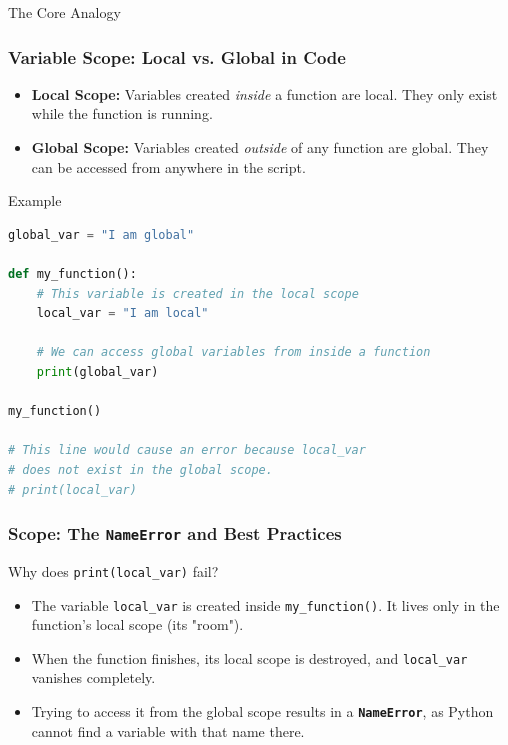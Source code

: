 \documentclass{beamer}
\begin{document}
\begin{frame}[fragile]
\begin{block}{The Core Analogy}
\begin{frame}[fragile]
    \frametitle{Variable Scope: Local vs. Global in Code}
    \begin{itemize}
    \item \textbf{Local Scope:} Variables created \textit{inside} a function are local. They only exist while the function is running.
    \item \textbf{Global Scope:} Variables created \textit{outside} of any function are global. They can be accessed from anywhere in the script.
    \end{itemize}
    
    \begin{block}{Example}
    \begin{lstlisting}[language=Python]
global_var = "I am global"

def my_function():
    # This variable is created in the local scope
    local_var = "I am local" 
    
    # We can access global variables from inside a function
    print(global_var)

my_function()

# This line would cause an error because local_var
# does not exist in the global scope.
# print(local_var)
    \end{lstlisting}
    \end{block}
\end{frame}

\begin{frame}[fragile]
    \frametitle{Scope: The \texttt{NameError} and Best Practices}
    
    \begin{block}{Why does \texttt{print(local\_var)} fail?}
        \begin{itemize}
            \item The variable \texttt{local\_var} is created inside \texttt{my\_function()}. It lives only in the function's local scope (its "room").
            \item When the function finishes, its local scope is destroyed, and \texttt{local\_var} vanishes completely.
            \item Trying to access it from the global scope results in a \textbf{\texttt{NameError}}, as Python cannot find a variable with that name there.
        \end{itemize}
    \end{block}
    

\end{frame}
\end{block}
\end{frame}
\end{document}
